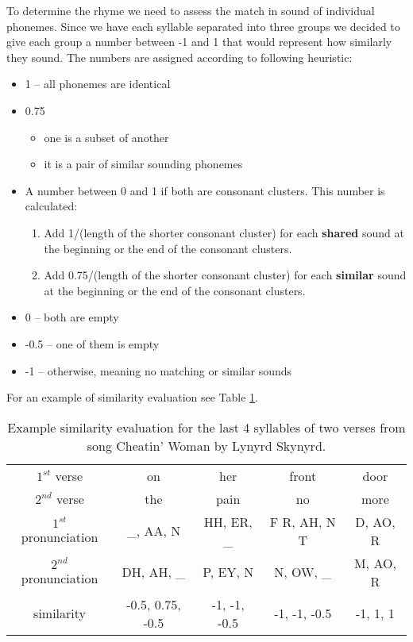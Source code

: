 To determine the rhyme we need to assess the match in sound of individual phonemes. Since we have each syllable separated into three groups we decided to give each group a number between -1 and 1 that would represent how similarly they sound. The numbers are assigned according to following heuristic:
\begin{itemize}
	\item 1 -- all phonemes are identical
	\item 0.75
	\begin{itemize}
		\item one is a subset of another
		\item it is a pair of similar sounding phonemes
	\end{itemize}
	\item A number between 0 and 1 if both are consonant clusters. This number is calculated:
	\begin{enumerate}
		\item Add 1/(length of the shorter consonant cluster) for each \textbf{shared} sound at the beginning or the end of the consonant clusters.
		\item Add 0.75/(length of the shorter consonant cluster) for each \textbf{similar} sound at the beginning or the end of the consonant clusters.
	\end{enumerate}
	\item 0 -- both are empty
	\item -0.5 -- one of them is empty
	\item -1 -- otherwise, meaning no matching or similar sounds
	
\end{itemize}

For an example of similarity evaluation see Table \ref{similarity_eval_table}.

\begin{table}[h!]
	\centering
	\begin{tabular}{c | c c c c} 
		$1^{st}$ verse & on & her & front & door \\ [0.5ex] 
		$2^{nd}$ verse & the & pain & no & more \\ 
		\hline
		$1^{st}$ pronunciation & \_, AA, N & HH, ER, \_ & F R, AH, N T & D, AO, R \\
		$2^{nd}$ pronunciation & DH, AH, \_ & P, EY, N & N, OW, \_ & M, AO, R \\
		\hline
		similarity & -0.5, 0.75, -0.5 & -1, -1, -0.5 & -1, -1, -0.5 & -1, 1, 1 \\
	\end{tabular}
	\caption{Example similarity evaluation for the last 4 syllables of two verses from song Cheatin' Woman by Lynyrd Skynyrd.}
	\label{similarity_eval_table}
\end{table}


